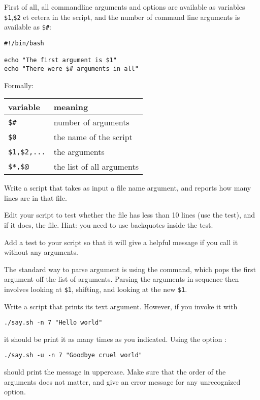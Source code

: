 First of all, all commandline arguments and options are available
as variables \verb+$1+,\verb+$2+ et cetera in the script, and
the number of command line arguments is available as \verb+$#+:
\begin{verbatim}
#!/bin/bash

echo "The first argument is $1"
echo "There were $# arguments in all"
\end{verbatim}

Formally:\\
\begin{tabular}{ll}
  \toprule
  variable&meaning\\
  \midrule
  \verb+$#+&number of arguments\\
  \verb+$0+&the name of the script\\
  \verb+$1,$2,...+&the arguments\\
  \verb+$*,$@+&the list of all arguments\\
  \bottomrule
\end{tabular}

\begin{exercise}
  Write a script that takes as input a file name argument, and reports how many
  lines are in that file.

  Edit your script to test whether the file has less than 10 lines
  (use the  test), and if it does,  the
  file. Hint: you need to use backquotes inside the test.

  Add a
  test to your script so that it will give a helpful message if you call
  it without any arguments.
\end{exercise}

The standard way to parse argument is using the 
command, which pops the first argument off the list of arguments.
Parsing the arguments in sequence then involves looking at \verb+$1+,
shifting, and looking at the new \verb+$1+.
%

\begin{exercise}
  Write a script  that prints its text argument. However, if you invoke it with 
\begin{verbatim}
./say.sh -n 7 "Hello world"
\end{verbatim}
  it should be print it as many times as you indicated. Using the
  option :
\begin{verbatim}
./say.sh -u -n 7 "Goodbye cruel world"
\end{verbatim}
  should print the message in uppercase. Make sure that the order of
  the arguments does not matter, and give an error message for any
  unrecognized option.
\end{exercise}

